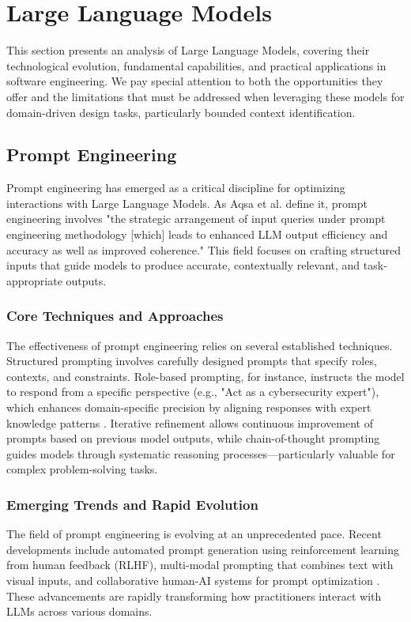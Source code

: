 \section{Large Language Models}
This section presents an analysis of Large Language Models, covering their technological evolution, fundamental capabilities, and practical applications in software engineering. We pay special attention to both the opportunities they offer and the limitations that must be addressed when leveraging these models for domain-driven design tasks, particularly bounded context identification.

\subsection{Prompt Engineering}
Prompt engineering has emerged as a critical discipline for optimizing interactions with Large Language Models. As Aqsa et al. \autocite[]{promptAqsa} define it, prompt engineering involves "the strategic arrangement of input queries under prompt engineering methodology [which] leads to enhanced LLM output efficiency and accuracy as well as improved coherence." This field focuses on crafting structured inputs that guide models to produce accurate, contextually relevant, and task-appropriate outputs.

\subsubsection{Core Techniques and Approaches}
The effectiveness of prompt engineering relies on several established techniques. Structured prompting involves carefully designed prompts that specify roles, contexts, and constraints. Role-based prompting, for instance, instructs the model to respond from a specific perspective (e.g., "Act as a cybersecurity expert"), which enhances domain-specific precision by aligning responses with expert knowledge patterns \autocite[]{promptAqsa}. Iterative refinement allows continuous improvement of prompts based on previous model outputs, while chain-of-thought prompting guides models through systematic reasoning processes—particularly valuable for complex problem-solving tasks.

\subsubsection{Emerging Trends and Rapid Evolution}
The field of prompt engineering is evolving at an unprecedented pace. Recent developments include automated prompt generation using reinforcement learning from human feedback (RLHF), multi-modal prompting that combines text with visual inputs, and collaborative human-AI systems for prompt optimization \autocite[]{promptAqsa}. These advancements are rapidly transforming how practitioners interact with LLMs across various domains.

